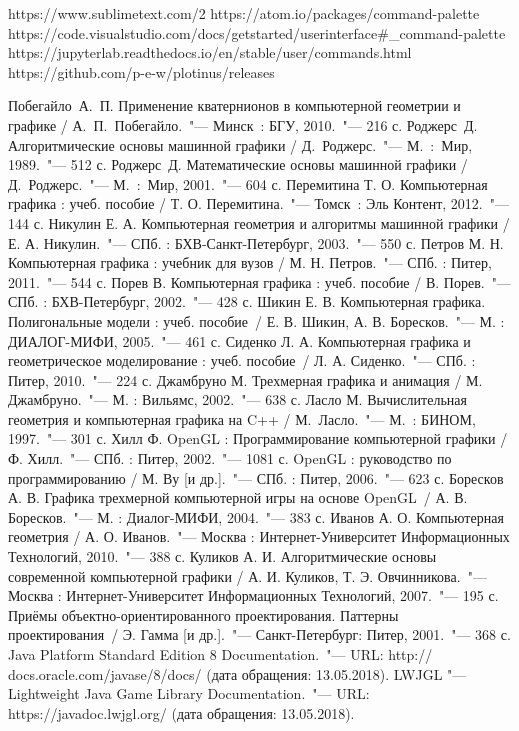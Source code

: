 \renewcommand{\bibname}{Список использованных источников}
\begin{thebibliography}{99}

 https://www.sublimetext.com/2
 https://atom.io/packages/command-palette
 https://code.visualstudio.com/docs/getstarted/userinterface\#\_command-palette
 https://jupyterlab.readthedocs.io/en/stable/user/commands.html
 https://github.com/p-e-w/plotinus/releases

 Побегайло~А.~П. Применение кватернионов в компьютерной геометрии и графике / А.~П.~Побегайло.~"--- Минск~: БГУ, 2010.~"--- 216 с.
 Роджерс~Д. Алгоритмические основы машинной графики / Д.~Роджерс.~"--- М.~:~Мир, 1989.~"--- 512 с.
 Роджерс~Д. Математические основы машинной графики / Д.~Роджерс.~"--- М.~:~Мир, 2001.~"--- 604 с.
 Перемитина Т. О. Компьютерная графика : учеб. пособие / Т. О. Перемитина.~"--- Томск~: Эль Контент, 2012.~"--- 144 с.
 Никулин Е. А. Компьютерная геометрия и алгоритмы машинной графики / Е. А. Никулин.~"--- СПб. : БХВ-Санкт-Петербург, 2003.~"--- 550 с.
 Петров М. Н. Компьютерная графика : учебник для вузов / М. Н. Петров.~"--- СПб. : Питер, 2011.~"--- 544 с.
 Порев В. Компьютерная графика : учеб. пособие / В. Порев.~"--- СПб. : БХВ-Петербург, 2002.~"--- 428 с.
 Шикин Е. В. Компьютерная графика. Полигональные модели : учеб. пособие~/ Е. В. Шикин, А. В. Боресков.~"--- М. : ДИАЛОГ-МИФИ, 2005.~"--- 461 с.
 Сиденко Л. А. Компьютерная графика и геометрическое моделирование : учеб. пособие~/ Л. А. Сиденко.~"--- СПб. : Питер, 2010.~"--- 224 с.
 Джамбруно М. Трехмерная графика и анимация / М. Джамбруно.~"--- М. : Вильямс, 2002.~"--- 638 с.
 Ласло М. Вычислительная геометрия и компьютерная графика на C++ / М.~Ласло.~"--- М.~: БИНОМ, 1997.~"--- 301 с.
 Хилл Ф. OpenGL : Программирование компьютерной графики / Ф. Хилл.~"--- СПб. : Питер, 2002.~"--- 1081 с.
 OpenGL : руководство по программированию / М. Ву [и др.].~"--- СПб. : Питер, 2006.~"--- 623 с.
 Боресков А. В. Графика трехмерной компьютерной игры на основе OpenGL~/ А. В. Боресков.~"--- М. : Диалог-МИФИ, 2004.~"--- 383 с.
 Иванов А. О. Компьютерная геометрия / А. О. Иванов.~"--- Москва : Интернет-Университет Информационных Технологий, 2010.~"--- 388 с.
 Куликов А. И. Алгоритмические основы современной компьютерной графики / А. И. Куликов, Т. Э. Овчинникова.~"--- Москва : Интернет-Университет Информационных Технологий, 2007.~"--- 195 с.
 Приёмы объектно-ориентированного проектирования. Паттерны проектирования~/ Э. Гамма [и др.].~"---
Санкт-Петербург: Питер, 2001.~"--- 368 с.
 Java Platform Standard Edition 8 Documentation.~"--- URL: http:// docs.oracle.com/javase/8/docs/
(дата обращения: 13.05.2018).
 LWJGL "--- Lightweight Java Game Library Documentation.~"--- URL: https://javadoc.lwjgl.org/
(дата обращения: 13.05.2018).
\end{thebibliography}
